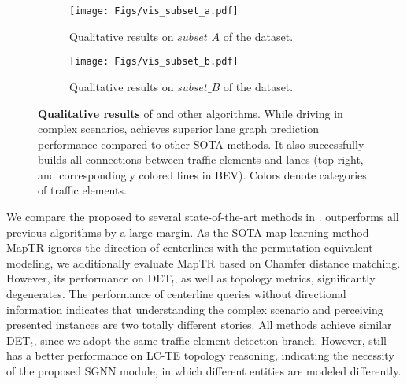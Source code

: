 \begin{figure*}[t!]
  \centering
       \begin{subfigure}[b]{\linewidth}
         \centering
         \texttt{[image: Figs/vis\_subset\_a.pdf]}
         \vspace{-15px}
        \caption{Qualitative results on $subset\_A$ of the \datasetname dataset.}
        \vspace{3px}
     \end{subfigure}
     
          \begin{subfigure}[b]{\linewidth}
         \centering
         \texttt{[image: Figs/vis\_subset\_b.pdf]}
         \vspace{-17px}
        \caption{Qualitative results on $subset\_B$ of the \datasetname dataset.}
     \end{subfigure}
      \vspace{-15pt}
  \caption{
  \textbf{Qualitative results} of \algname and other algorithms. While driving in complex scenarios, \algname achieves superior lane graph prediction performance compared to other SOTA methods. It also successfully builds all connections between traffic elements and lanes (top right, and correspondingly colored lines in BEV).
Colors denote categories of traffic elements.
  }
  \label{fig:vis}
\end{figure*}

We compare the proposed \algname to several state-of-the-art methods in . 
\algname outperforms all previous algorithms by a large margin.
As the SOTA map learning method MapTR ignores the direction of centerlines with the permutation-equivalent modeling, we additionally evaluate MapTR based on Chamfer distance matching. 
However, its performance on DET$_l$, as well as topology metrics, significantly degenerates. 
The performance of centerline queries without directional information indicates that understanding the complex scenario and perceiving presented instances are two totally different stories.
All methods achieve similar DET$_t$, since we adopt the same traffic element detection branch.
However, \algname still has a better performance on LC-TE topology reasoning, indicating the necessity of the proposed SGNN module, in which different entities are modeled differently.


